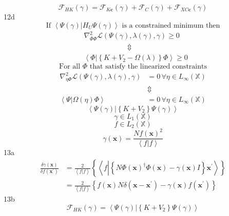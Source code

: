 \documentclass[aps,preprint]{revtex4}%
\begin{document}
\[
\mathcal{F}_{HK}\left(  \gamma\right)  =\mathcal{F}_{K\mathbf{c}}\left(
\gamma\right)  +\mathcal{F}_{C}\left(  \gamma\right)  +\mathcal{F}%
_{XC\mathbf{c}}\left(  \gamma\right)
\]
12d%
\[
\text{If }\left\langle \Psi\left(  \gamma\right)  \left\vert H_{U}\right.
\Psi\left(  \gamma\right)  \right\rangle \text{ is a constrained minimum then}%
\]%
\begin{align*}
&  \left.  \nabla_{\bar{\Phi}\Phi}^{2}\mathcal{L}\left(  \Psi\left(
\gamma\right)  ,\lambda\left(  \gamma\right)  ,\gamma\right)  \geq0\right. \\
&  \qquad\qquad\qquad\left.  \Updownarrow\right. \\
&  \left.  \left\langle \left.  \Phi\right\vert \left\{  K+V_{2}-\Omega\left(
\lambda\right)  \right\}  \Phi\right\rangle \geq0\right.
\end{align*}%
\[
\text{For all }\Phi\text{ that satisfy the linearized constraints}%
\]%
\begin{align*}
\nabla_{\eta\Phi}^{2}\mathcal{L}\left(  \Psi\left(  \gamma\right)
,\lambda\left(  \gamma\right)  ,\gamma\right)   &  =0\,\forall\eta\in
L_{\infty}\left(  \mathbb{X}\right) \\
&  \Updownarrow\\
\left\langle \left.  \Psi\right\vert \Omega\left(  \eta\right)  \Phi
\right\rangle  &  =0\,\forall\eta\in L_{\infty}\left(  \mathbb{X}\right)
\end{align*}%
\[
\left\langle \left.  \Psi\left(  \gamma\right)  \right\vert \left\{
K+V_{2}\right\}  \Psi\left(  \gamma\right)  \right\rangle
\]%
\[
\gamma\in L_{1}\left(  \mathbb{X}\right)
\]%
\[
f\in L_{2}\left(  \mathbb{X}\right)
\]%
\[
\gamma\left(  \mathbf{x}\right)  =\frac{Nf\left(  \mathbf{x}\right)  ^{2}%
}{\left\langle f|f\right\rangle }%
\]
13a%
\begin{align*}
\frac{\delta\gamma\left(  \mathbf{x}\right)  }{\delta f\left(  \mathbf{x}%
^{\prime}\right)  }  &  =\frac{2}{\left\langle f|f\right\rangle }\left\{
\left\langle f\left\vert \overset{}{\left\{  N\Phi\left(  \mathbf{x}\right)
^{\dagger}\Phi\left(  \mathbf{x}\right)  -\gamma\left(  \mathbf{x}\right)
I\right\}  }\right.  \mathbf{x}^{\prime}\right\rangle \right\} \\
&  =\frac{2}{\left\langle f|f\right\rangle }\left\{  f\left(  \mathbf{x}%
\right)  N\delta\left(  \mathbf{x-x}^{\prime}\right)  -\gamma\left(
\mathbf{x}\right)  f\left(  \mathbf{x}^{\prime}\right)  \right\}
\end{align*}
13b%
\[
\mathcal{F}_{HK}\left(  \gamma\right)  =\left\langle \left.  \Psi\left(
\gamma\right)  \right\vert \left\{  K+V_{2}\right\}  \Psi\left(
\gamma\right)  \right\rangle
\]
\end{document}

